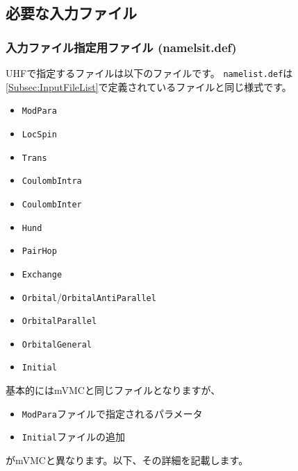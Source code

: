 \subsection{必要な入力ファイル}
\subsubsection{入力ファイル指定用ファイル (namelsit.def)}
UHFで指定するファイルは以下のファイルです。
\verb|namelist.def|は\ref{Subsec:InputFileList}で定義されているファイルと同じ様式です。\\
\begin{itemize}
\item{\verb|ModPara|}
\item{\verb|LocSpin|}
\item{\verb|Trans|}
\item{\verb|CoulombIntra|}
\item{\verb|CoulombInter|}
\item{\verb|Hund|}
\item{\verb|PairHop|}
\item{\verb|Exchange|}
\item{\verb|Orbital|/\verb|OrbitalAntiParallel|}
\item{\verb|OrbitalParallel|}
\item{\verb|OrbitalGeneral|}
\item{\verb|Initial|}
\end{itemize}
基本的にはmVMCと同じファイルとなりますが、
 \begin{itemize}
 \item{\verb|ModPara|ファイルで指定されるパラメータ}
 \item{\verb|Initial|ファイルの追加}
 \end{itemize}
がmVMCと異なります。以下、その詳細を記載します。


